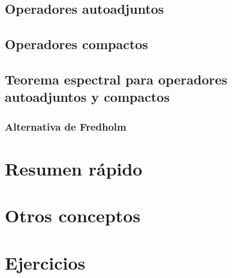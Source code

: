 \documentclass[palatino]{apuntes}
\begin{document}
\section{Operadores autoadjuntos}

\section{Operadores compactos}

\section{Teorema espectral para operadores autoadjuntos y compactos}

\subsection{Alternativa de Fredholm}

\appendix

\chapter{Resumen rápido}


\chapter{Otros conceptos}


\chapter{Ejercicios}


\nocite{brezis2010functional,reed1980methods,rudin1991functional,ApuntesVarReal}
{}

\printindex
\end{document}
